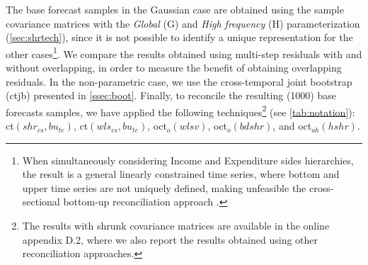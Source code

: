 \documentclass[a4paper,11pt]{article}
\theoremstyle{definition}
\begin{document}
The base forecast samples in the Gaussian case are obtained using the sample covariance matrices with the \textit{Global} (G) and \textit{High frequency} (H) parameterization (\autoref{sec:shrtech}), since it is not possible to identify a unique representation for the other cases\footnote{When simultaneously considering Income and Expenditure sides hierarchies, the result is a general linearly constrained time series, where bottom and upper time series are not uniquely defined, making unfeasible the cross-sectional bottom-up reconciliation approach \citep{giro2022}.}. We compare the results obtained using multi-step residuals with and without overlapping, in order to measure the benefit of obtaining overlapping residuals. In the non-parametric case, we use the cross-temporal joint bootstrap (ctjb) presented in \autoref{ssec:boot}. Finally, to reconcile the resulting (1000) base forecasts samples, we have applied the following techniques\footnote{The results with shrunk covariance matrices are available in the online appendix D.2, where we also report the results obtained using other reconciliation approaches.} (see \autoref{tab:notation}): ct$(shr_{cs}, bu_{te})$, ct$(wls_{cs}, bu_{te})$, oct$_o(wlsv)$, oct$_o(bdshr)$, and oct$_{oh}(hshr)$.
\end{document}
